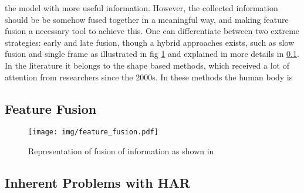 the model with more useful information. However, the collected information should be be somehow fused together in a meaningful way, and making feature fusion a necessary tool to achieve this. One can differentiate between two extreme strategies: early and late fusion, though a hybrid approaches exists, such as slow fusion and single frame as illustrated in fig \ref{fig:feature_fusion} and explained in more details in \ref{subsec:feature-fusion}.
In the literature it belongs to the shape based methods, which received a lot of attention from researchers since the 2000s. In these methods the human body is 
\subsection{Feature Fusion}\label{subsec:feature-fusion}
\begin{figure}
	\centering
	\texttt{[image: img/feature\_fusion.pdf]}
	\caption{Representation of fusion of information as shown in \cite{karpathy2014large}}
	\label{fig:feature_fusion}
\end{figure}
\subsection{Inherent Problems with HAR}\label{subsec:probHAR}

